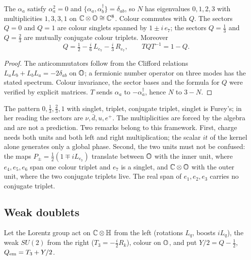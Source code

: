 \begin{proposition}\label{prop:charges}
The \(\alpha_a\) satisfy \(\alpha_a^2=0\) and \(\{\alpha_a,\alpha_b^\dagger\}=\delta_{ab}\), so \(N\) has eigenvalues \(0,1,2,3\) with
multiplicities \(1,3,3,1\) on \(\mathbb C\otimes\mathbb O\cong\mathbb C^8\).  Colour commutes with \(Q\).  The sectors \(Q=0\) and \(Q=1\) are colour
singlets spanned by \(1\pm i\,e_7\); the sectors \(Q=\tfrac13\) and \(Q=\tfrac23\) are mutually conjugate colour triplets.  Moreover
\[
Q=\tfrac12-\tfrac{i}{6}\,L_{e_7}-\tfrac{i}{3}\,R_{e_7},\qquad TQT^{-1}=1-Q .
\]
\end{proposition}

\begin{proof}
The anticommutators follow from the Clifford relations \(L_aL_b+L_bL_a=-2\delta_{ab}\) on \(\mathbb O\); a fermionic number operator on three
modes has the stated spectrum.  Colour invariance, the sector bases and the formula for \(Q\) were verified by explicit matrices.
\(T\) sends \(\alpha_a\) to \(-\alpha_a^\dagger\), hence \(N\) to \(3-N\).
\end{proof}

The pattern \(0,\tfrac13,\tfrac23,1\) with singlet, triplet, conjugate triplet, singlet is Furey's; in her reading the sectors are
\(\nu,\bar d,u,e^+\).  The multiplicities are forced by the algebra and are not a prediction.  Two remarks belong to this framework.
First, charge needs both units and both left and right multiplication; the scalar \(it\) of the kernel alone generates only a global
phase.  Second, the two units must not be confused: the maps \(P_\pm=\tfrac12(1\mp iL_{e_7})\) translate between \(\mathbb O\) with the inner unit,
where \(e_4,e_5,e_6\) span one colour triplet and \(e_7\) is a singlet, and \(\mathbb C\otimes\mathbb O\) with the outer unit, where the two
conjugate triplets live.  The real span of \(e_1,e_2,e_3\) carries no conjugate triplet.

\subsection{Weak doublets}

Let the Lorentz group act on \(\mathbb C\otimes\mathbb H\) from the left (rotations \(L_q\), boosts \(iL_q\)), the weak \(SU(2)\) from the right
(\(T_3=-\tfrac i2R_k\)), colour on \(\mathbb O\), and put \(Y/2=Q-\tfrac12\), \(Q_{\rm em}=T_3+Y/2\).

